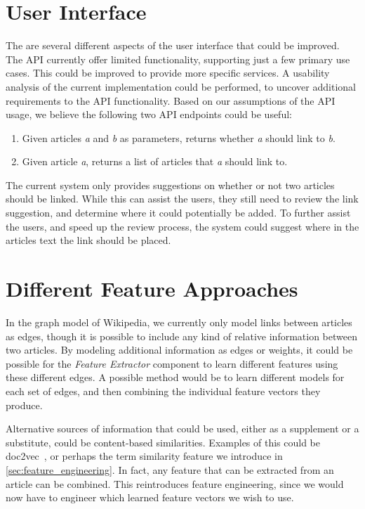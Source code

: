 \section{User Interface}
The are several different aspects of the user interface that could be improved. The API currently offer limited functionality, supporting just a few primary use cases. This could be improved to provide more specific services. A usability analysis of the current implementation could be performed, to uncover additional requirements to the API functionality. Based on our assumptions of the API usage, we believe the following two API endpoints could be useful:

\begin{enumerate}
    \item Given articles \emph{a} and \emph{b} as parameters, returns whether \emph{a} should link to \emph{b}.
    \item Given article \emph{a}, returns a list of articles that \emph{a} should link to.
\end{enumerate}

The current system only provides suggestions on whether or not two articles should be linked. While this can assist the users, they still need to review the link suggestion, and determine where it could potentially be added. To further assist the users, and speed up the review process, the system could suggest where in the articles text the link should be placed.

\section{Different Feature Approaches}
In the graph model of Wikipedia, we currently only model links between articles as edges, though it is possible to include any kind of relative information between two articles. By modeling additional information as edges or weights, it could be possible for the \emph{Feature Extractor} component to learn different features using these different edges. A possible method would be to learn different models for each set of edges, and then combining the individual feature vectors they produce.

Alternative sources of information that could be used, either as a supplement or a substitute, could be content-based similarities. Examples of this could be doc2vec~\cite{le2014distributed}, or perhaps the term similarity feature we introduce in \cref{sec:feature_engineering}. In fact, any feature that can be extracted from an article can be combined. This reintroduces feature engineering, since we would now have to engineer which learned feature vectors we wish to use.

